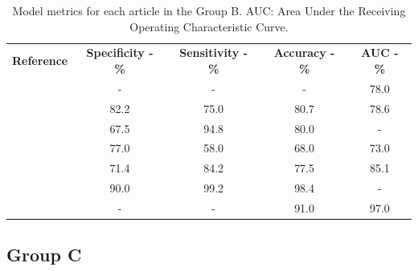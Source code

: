 \documentclass{article}
\begin{document}
\begin{table}[]
    \centering
    \begin{tabular}{ccccc}\toprule
        \multirow{2}{*}{\textbf{Reference}} & \multirow{2}{*}{\textbf{Specificity - \%}} & \multirow{2}{*}{\textbf{Sensitivity - \%}} & \multirow{2}{*}{\textbf{Accuracy - \%}} & \multirow{2}{*}{\textbf{AUC - \%}} \\
        \\\midrule
        \cite{Shoemaker2018}                & -                                          & -                                          & -                                       & 78.0                               \\
        \cite{Koyuncu2019}                  & 82.2                                       & 75.0                                       & 80.7                                    & 78.6                               \\
        \cite{Li2019}                       & 67.5                                       & 94.8                                       & 80.0                                    & -                                  \\
        \cite{Andersen2021}                 & 77.0                                       & 58.0                                       & 68.0                                    & 73.0                               \\
        \cite{Moawad2021}                   & 71.4                                       & 84.2                                       & 77.5                                    & 85.1                               \\
        \cite{Barstugan2020}                & 90.0                                       & 99.2                                       & 98.4                                    & -                                  \\
        \cite{Stanzione2021}                & -                                          & -                                          & 91.0                                    & 97.0                               \\
        \bottomrule
    \end{tabular}
    \caption{Model metrics for each article in the Group B. AUC: Area Under the Receiving Operating Characteristic Curve.}
    \label{tab:res_B}
\end{table}

\subsection{Group C}
\end{document}
